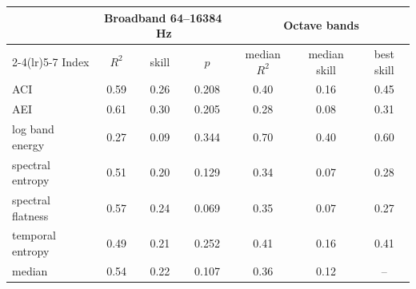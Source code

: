 \begin{tabular}{lcccccc}
\toprule
 & \multicolumn{3}{c}{Broadband 64--16384\,Hz} & \multicolumn{3}{c}{Octave bands}\\
\cmidrule(lr){2-4}\cmidrule(lr){5-7}
Index & $R^2$ & skill & $p$ & median $R^2$ & median skill & best skill\\
\midrule
ACI & 0.59 & 0.26 & 0.208 & 0.40 & 0.16 & 0.45\\
AEI & 0.61 & 0.30 & 0.205 & 0.28 & 0.08 & 0.31\\
log band energy & 0.27 & 0.09 & 0.344 & 0.70 & 0.40 & 0.60\\
spectral entropy & 0.51 & 0.20 & 0.129 & 0.34 & 0.07 & 0.28\\
spectral flatness & 0.57 & 0.24 & 0.069 & 0.35 & 0.07 & 0.27\\
temporal entropy & 0.49 & 0.21 & 0.252 & 0.41 & 0.16 & 0.41\\
\midrule
median & 0.54 & 0.22 & 0.107 & 0.36 & 0.12 & --\\
\bottomrule
\end{tabular}
